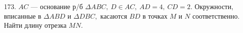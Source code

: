 173. $AC$ --- основание р/б $\Delta ABC,\ D\in AC,\ AD=4,\ CD=2.$ Окружности, вписанные в $\Delta ABD$ и $\Delta DBC,$ касаются $BD$ в точках $M$ и $N$ соответственно. Найти длину отрезка $MN.$\\
